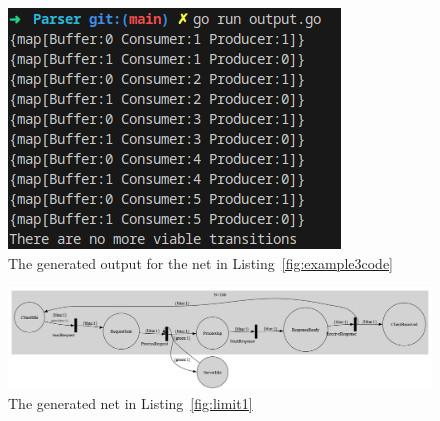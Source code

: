 \documentclass[12pt]{article}
\begin{document}
    \begin{figure}[htbp]
        \centering
        \includegraphics[width=\linewidth/2]{Output2.png}  %
        \caption{The generated output for the net in Listing~\ref{fig:example3code}}
        \label{fig:example3output}
    \end{figure}

    \begin{figure}[p]  %
        \centering
        
    \end{figure}

    
    \begin{figure}[htbp]
        \centering
        \includegraphics[width=\linewidth]{example1.png}  %
        \caption{The generated net in Listing~\ref{fig:limit1}}
        \label{fig:example1png}
      \end{figure}
\end{document}
